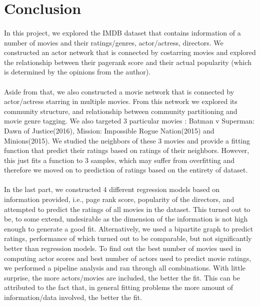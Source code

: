 \section*{Conclusion}
\paragraph{}
In this project, we explored the IMDB dataset that contains information of a number of movies and their ratings/genres, actor/actress, directors. We constructed an actor network that is connected by costarring movies and explored the relationship between their pagerank score and their actual popularity (which is determined by the opinions from the author). 
\paragraph{}
Aside from that, we also constructed a movie network that is connected by actor/actress starring in multiple movies. From this network we explored its community structure, and relationship between community partitioning and movie genre tagging. We also targeted 3 particular movies : Batman v Superman: Dawn of Justice(2016), Mission: Impossible Rogue Nation(2015) and Minions(2015). We studied the neighbors of these 3 movies and provide a fitting function that predict their ratings based on ratings of their neighbors. However, this just fits a function to 3 samples, which may suffer from overfitting and therefore we moved on to prediction of ratings based on the entirety of dataset.
\paragraph{}
In the last part, we constructed 4 different regression models based on information provided, i.e., page rank score, popularity of the directors, and attempted  to predict the ratings of all movies in the dataset. This turned out to be, to some extend, undesirable as the dimension of the information is not high enough to generate a good fit. Alternatively, we used a bipartite graph to predict ratings, performance of which turned out to be comparable, but not significantly better than regression models. To find out the best number of movies used in computing actor scores and best number of actors used to predict movie ratings, we performed a pipeline analysis and ran through all combinations. With little surprise, the more actors/movies are included, the better the fit. This can be attributed to the fact that, in general fitting problems the more amount of information/data involved, the better the fit.
